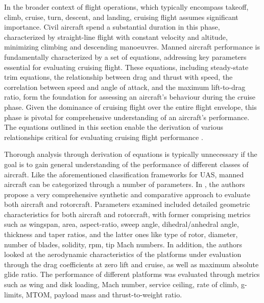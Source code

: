 \documentclass[english, 12pt, a4paper, elec, utf8, a-1b, online]{aaltothesis}
\begin{document}
In the broader context of flight operations, which typically encompass takeoff, climb, cruise, turn, descent, and landing, cruising flight assumes significant importance.
Civil aircraft spend a substantial duration in this phase, characterized by straight-line flight with constant velocity and altitude, minimizing climbing and descending manoeuvres.
Manned aircraft performance is fundamentally characterized by a set of equations, addressing key parameters essential for evaluating cruising flight.
These equations, including steady-state trim equations, the relationship between drag and thrust with speed, the correlation between speed and angle of attack, and the maximum lift-to-drag ratio, form the foundation for assessing an aircraft's behaviour during the cruise phase.
Given the dominance of cruising flight over the entire flight envelope, this phase is pivotal for comprehensive understanding of an aircraft's performance.
The equations outlined in this section enable the derivation of various relationships critical for evaluating cruising flight performance \cite{sadraey2017ch5}.

Thorough analysis through derivation of equations is typically unnecessary if the goal is to gain general understanding of the performance of different classes of aircraft.
Like the aforementioned classification frameworks for UAS, manned aircraft can be categorized through a number of parameters.
In \cite{filippone2000data}, the authors propose a very comprehensive synthetic and comparative approach to evaluate both aircraft and rotorcraft.
Parameters examined included detailed geometric characteristics for both aircraft and rotorcraft, with former comprising metrics such as wingspan, area, aspect-ratio, sweep angle, dihedral/anhedral angle, thickness and taper ratios, and the latter ones like type of rotor, diameter, number of blades, solidity, rpm, tip Mach numbers.
In addition, the authors looked at the aerodynamic characteristics of the platforms under evaluation through the drag coefficients at zero lift and cruise, as well as maximum absolute glide ratio.
The performance of different platforms was evaluated through metrics such as wing and disk loading, Mach number, service ceiling, rate of climb, g-limits, MTOM, payload mass and thrust-to-weight ratio.
\end{document}
